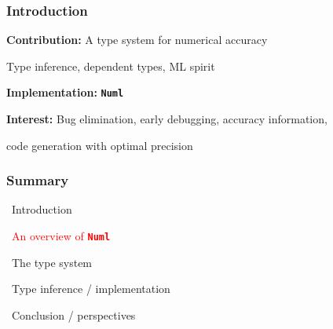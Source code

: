 \documentclass[handout,t]{beamer}
\def\mytt#1{\texttt{\textbf{#1}}}
\begin{document}
\begin{frame}
\frametitle{Introduction}


\vspace{1cm}

\textbf{Contribution:} A type system for numerical accuracy

\vspace{0.2cm}

Type inference, dependent types, ML spirit

\vspace{1cm}

\textbf{Implementation:} \mytt{Numl}

\vspace{1cm}

\textbf{Interest:} Bug elimination, early debugging, accuracy information, 

\vspace{0.2cm}

code generation with optimal precision 



\end{frame}

\begin{frame}
\frametitle{Summary}


\vspace{1.1cm}

~\hspace{1cm}\quad Introduction

\vspace{0.6cm}

~\hspace{1cm}\textcolor{red}{\quad An overview of \mytt{Numl}}

\vspace{0.6cm}

~\hspace{1cm}\quad The type system

\vspace{0.6cm}

~\hspace{1cm}\quad Type inference / implementation

\vspace{0.6cm}

~\hspace{1cm}\quad Conclusion / perspectives

\end{frame}
\end{document}
